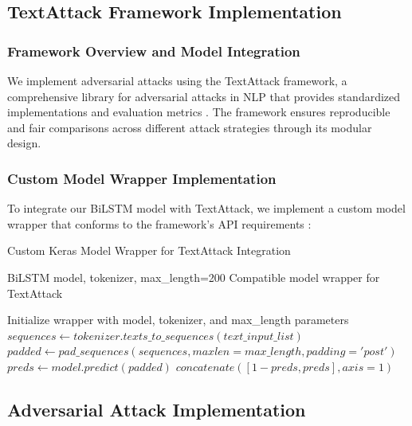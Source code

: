 \documentclass[../main.tex]{subfiles}
\begin{document}
\subsection{TextAttack Framework Implementation}

\subsubsection{Framework Overview and Model Integration}

We implement adversarial attacks using the TextAttack framework, a comprehensive library for adversarial attacks in NLP that provides standardized implementations and evaluation metrics \cite{morris2020textattack}. The framework ensures reproducible and fair comparisons across different attack strategies through its modular design.

\subsubsection{Custom Model Wrapper Implementation}

To integrate our BiLSTM model with TextAttack, we implement a custom model wrapper that conforms to the framework's API requirements \cite{morris2020textattack}:

\begin{breakablealgorithm}{Custom Keras Model Wrapper for TextAttack Integration}
\begin{algorithmic}[1]
\Require BiLSTM model, tokenizer, max\_length=200 
\Ensure Compatible model wrapper for TextAttack 

\State Initialize wrapper with model, tokenizer, and max\_length parameters
 
    \State $sequences \gets tokenizer.texts\_to\_sequences(text\_input\_list)$ 
    \State $padded \gets pad\_sequences(sequences, maxlen=max\_length, padding='post')$ 
    \State $preds \gets model.predict(padded)$ 
    \State \Return $concatenate([1 - preds, preds], axis=1)$ 
\EndFunction
\end{algorithmic}
\end{breakablealgorithm}

\subsection{Adversarial Attack Implementation}
\end{document}
